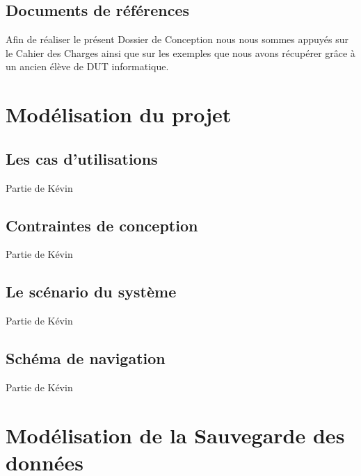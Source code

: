 \documentclass[11pt]{article}
\begin{document}
\subsection{Documents de références}

Afin de réaliser le présent Dossier de Conception nous nous sommes appuyés sur le Cahier des Charges ainsi que sur les
exemples que nous avons récupérer grâce à un ancien élève de DUT informatique.




\newpage


\section{Modélisation du projet}


\subsection{Les cas d'utilisations}

Partie de Kévin
\subsection{Contraintes de conception}

Partie de Kévin
\subsection{Le scénario du système}

Partie de Kévin
\subsection{Schéma de navigation}

Partie de Kévin


\newpage

\section{Modélisation de la Sauvegarde des données}
\end{document}
